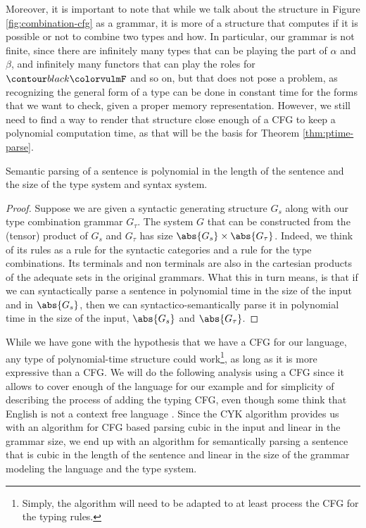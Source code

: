 \medskip

Moreover, it is important to note that while we talk about the structure in
Figure \ref{fig:combination-cfg} as a grammar, it is more of a structure that
computes if it is possible or not to combine two types and how.
In particular, our grammar is not finite, since there are infinitely many types
that can be playing the part of $\alpha$ and $\beta$, and infinitely many
functors that can play the roles for $\f{F}$ and so on, but that does not pose
a problem, as recognizing the general form of a type can be done in constant
time for the forms that we want to check, given a proper memory representation.
However, we still need to find a way to render that structure close enough of
a CFG to keep a polynomial computation time, as that will be the basis for
Theorem \ref{thm:ptime-parse}.

\begin{thm}
	\label{thm:ptime-parse}
	Semantic parsing of a sentence is polynomial in the length of the	sentence
	and the size of the type system and syntax system.
\end{thm}
\begin{proof}
	Suppose we are given a syntactic generating structure $G_{s}$ along with our
	type combination grammar $G_{\tau}$.
	The system $G$ that can be constructed from the (tensor) product of $G_{s}$ and
	$G_{\tau}$ has size $\abs{G_{s}}\times \abs{G_{\tau}}$.
	Indeed, we think of its rules as a rule for the syntactic categories and a rule
	for the type combinations. Its terminals and non terminals are also in the
	cartesian products of the adequate sets in the original grammars.
	What this in turn means, is that if we can syntactically parse a sentence in
	polynomial time in the size of the input and in $\abs{G_{s}}$, then we can
	syntactico-semantically parse it in polynomial time in the size of the input,
	$\abs{G_{s}}$ and $\abs{G_{\tau}}$.
\end{proof}

While we have gone with the hypothesis that we have a CFG for our language,
any type of polynomial-time structure could work\footnote{Simply, the algorithm
	will need to be	adapted to at least process the CFG for the typing rules.},
as long as it is more expressive than a CFG.
We will do the following analysis using a CFG since it allows to cover enough of
the language for our example and for simplicity of describing the process of
adding the typing CFG, even though some think that English is not a context
free language \cite{higginbothamEnglishNotContextFree1984}.
Since the CYK algorithm provides us with an algorithm for CFG based parsing
cubic in the input and linear in the grammar size, we end up with an algorithm
for semantically parsing a sentence that is cubic in the length of the sentence
and linear in the size of the grammar modeling the language and the type system.

